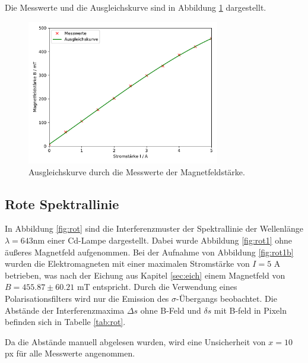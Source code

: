 \noindent
Die Messwerte und die Ausgleichskurve sind in Abbildung \ref{fig:bfeld} dargestellt.

\begin{figure}
    \centering
    \includegraphics[width=0.75\textwidth]{data/Magnetfeld.pdf}
    \caption{Ausgleichskurve durch die Messwerte der Magnetfeldstärke.}
    \label{fig:bfeld}
  \end{figure}

\newpage
\subsection{Rote Spektrallinie}
In Abbildung \ref{fig:rot} sind die Interferenzmuster der Spektrallinie der Wellenlänge $\lambda = 643$nm einer Cd-Lampe dargestellt.
Dabei wurde Abbildung \ref{fig:rot1} ohne äußeres Magnetfeld aufgenommen.
Bei der Aufnahme von Abbildung \ref{fig:rot1b} wurden die Elektromagneten mit einer maximalen Stromstärke von $I=5$ A betrieben, was nach der Eichung aus Kapitel \ref{sec:eich} einem Magnetfeld von $B= 455.87 \pm 60.21$ mT entspricht.
Durch die Verwendung eines Polarisationsfilters wird nur die Emission des $\sigma$-Übergangs beobachtet.
Die Abstände der Interferenzmaxima $\Delta s$ ohne B-Feld und $\delta s$ mit B-feld in Pixeln befinden sich in Tabelle \ref{tab:rot}.


\noindent
Da die Abstände manuell abgelesen wurden, wird eine Unsicherheit von $x=10$ px für alle Messwerte angenommen.


